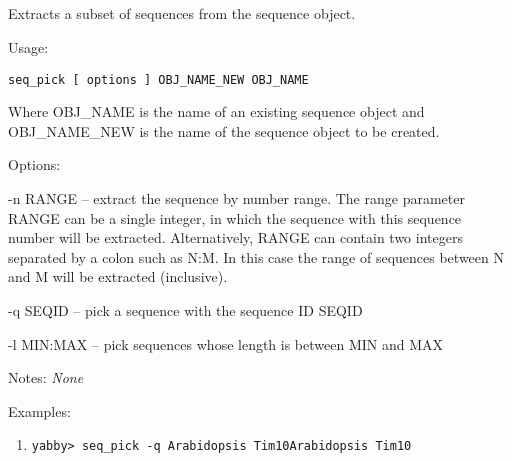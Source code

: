 


\subsection[seq\_pick]{  }



Extracts a subset of sequences from the sequence object.


\begin{description}


\item{Usage:}

{\tt seq\_pick [ options ] OBJ\_NAME\_NEW OBJ\_NAME}

Where OBJ\_NAME is the name of an existing sequence object
and OBJ\_NAME\_NEW is the name of the sequence object to be created.


\item{Options:}
\begin{description}
\item -n RANGE -- extract the sequence by number range.
                  The range parameter RANGE can be a single integer, in which
                  the sequence with this sequence number will be extracted.
                  Alternatively, RANGE can contain two integers separated
                  by a colon such as N:M.  In this case the range of sequences
                  between N and M will be extracted (inclusive).
\item -q SEQID -- pick a sequence with the sequence ID SEQID
\item -l MIN:MAX -- pick sequences whose length is between MIN and MAX
\end{description}


\item{Notes:} {\em None}


\item{Examples:}
\begin{enumerate}

\item
\begin{verbatim}
yabby> seq_pick -q Arabidopsis Tim10Arabidopsis Tim10


\end{verbatim}
\end{enumerate}
\end{description}
